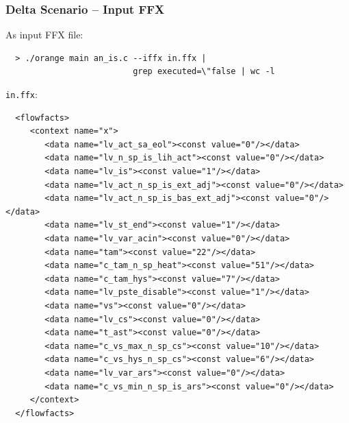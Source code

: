 \documentclass{beamer}
\begin{document}
\begin{frame}[fragile]
  \frametitle{Delta Scenario -- Input FFX}

  \bigskip
  As input FFX file:
  {\small
  \begin{verbatim}
  > ./orange main an_is.c --iffx in.ffx | 
                          grep executed=\"false | wc -l
  \end{verbatim}
  }

  \bigskip
  {\tt in.ffx}:
  {\tiny
  \begin{verbatim}
  <flowfacts>
     <context name="x">
        <data name="lv_act_sa_eol"><const value="0"/></data>
        <data name="lv_n_sp_is_lih_act"><const value="0"/></data>
        <data name="lv_is"><const value="1"/></data>
        <data name="lv_act_n_sp_is_ext_adj"><const value="0"/></data>
        <data name="lv_act_n_sp_is_bas_ext_adj"><const value="0"/></data>
        <data name="lv_st_end"><const value="1"/></data>
        <data name="lv_var_acin"><const value="0"/></data>
        <data name="tam"><const value="22"/></data>				
        <data name="c_tam_n_sp_heat"><const value="51"/></data>
        <data name="c_tam_hys"><const value="7"/></data>				
        <data name="lv_pste_disable"><const value="1"/></data>	
        <data name="vs"><const value="0"/></data>			
        <data name="lv_cs"><const value="0"/></data>		
        <data name="t_ast"><const value="0"/></data>	
        <data name="c_vs_max_n_sp_cs"><const value="10"/></data>	
        <data name="c_vs_hys_n_sp_cs"><const value="6"/></data>	
        <data name="lv_var_ars"><const value="0"/></data>		
        <data name="c_vs_min_n_sp_is_ars"><const value="0"/></data>
     </context>
  </flowfacts>
  \end{verbatim}
  }
\end{frame} 
\end{document}
